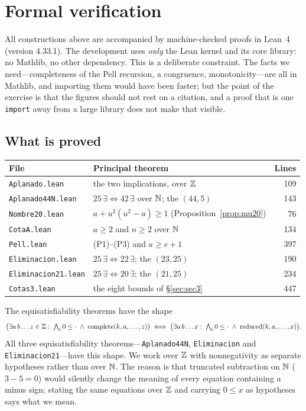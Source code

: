 \section{Formal verification}
\label{sec:lean}

All constructions above are accompanied by machine-checked proofs in Lean~4
\cite{lean4} (version 4.33.1). The development uses \emph{only} the Lean kernel
and its core library: no Mathlib, no other dependency. This is a deliberate
constraint. The facts we need---completeness of the Pell recursion, a
congruence, monotonicity---are all in Mathlib, and importing them would have
been faster; but the point of the exercise is that the figures should not rest
on a citation, and a proof that is one \texttt{import} away from a large library
does not make that visible.

\subsection{What is proved}

\begin{center}
\begin{tabular}{@{}llr@{}}
\toprule
\textbf{File} & \textbf{Principal theorem} & \textbf{Lines} \\
\midrule
\texttt{Aplanado.lean} & the two implications, over $\mathbb{Z}$ & 109 \\
\texttt{Aplanado44N.lean} & $25\,\exists \Leftrightarrow 42\,\exists$ over $\mathbb{N}$; the $(44,5)$ & 143 \\
\texttt{Nombre20.lean} & $a+u^2(u^2-a)\ge1$ (Proposition~\ref{prop:mu20}) & 76 \\
\texttt{CotaA.lean} & $a\ge2$ and $n\ge2$ over $\mathbb{N}$ & 134 \\
\texttt{Pell.lean} & (P1)--(P3) and $a\ge e+1$ & 397 \\
\texttt{Eliminacion.lean} & $25\,\exists \Leftrightarrow 22\,\exists$; the $(23,25)$ & 190 \\
\texttt{Eliminacion21.lean} & $25\,\exists \Leftrightarrow 20\,\exists$; the $(21,25)$ & 234 \\
\texttt{Cotas3.lean} & the eight bounds of \S\ref{sec:sec3} & 447 \\
\bottomrule
\end{tabular}
\end{center}

The equisatisfiability theorems have the shape
\[
  \bigl(\exists a\,b\dots z\in\mathbb{Z}:\; \textstyle\bigwedge_i 0\le\cdot \;\wedge\;
  \mathrm{complete}(k,a,\dots,z)\bigr)
  \;\Longleftrightarrow\;
  \bigl(\exists a\,b\dots x:\; \textstyle\bigwedge_i 0\le\cdot \;\wedge\;
  \mathrm{reduced}(k,a,\dots,x)\bigr) .
\]
All three equisatisfiability theorems---\texttt{Aplanado44N},
\texttt{Eliminacion} and \texttt{Eliminacion21}---have this shape. We work over
$\mathbb{Z}$ with nonnegativity as separate hypotheses rather than over $\mathbb{N}$. The reason is that truncated subtraction on $\mathbb{N}$ ($3-5=0$) would silently
change the meaning of every equation containing a minus sign; stating the same
equations over $\mathbb{Z}$ and carrying $0\le x$ as hypotheses says what we mean.

